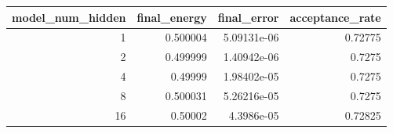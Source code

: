 \begin{tabular}{rrrr}
\toprule
model_num_hidden & final_energy & final_error & acceptance_rate \\
\midrule
1 & 0.500004 & 5.09131e-06 & 0.72775 \\
2 & 0.499999 & 1.40942e-06 & 0.7275 \\
4 & 0.49999 & 1.98402e-05 & 0.7275 \\
8 & 0.500031 & 5.26216e-05 & 0.7275 \\
16 & 0.50002 & 4.3986e-05 & 0.72825 \\
\bottomrule
\end{tabular}
